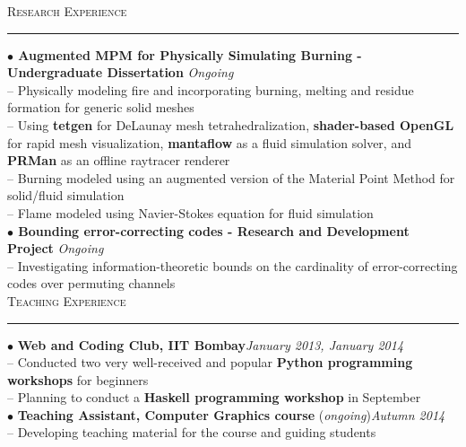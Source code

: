 \documentclass[a4paper,9pt]{article}
\begin{document}
\large{\textsc{Research Experience}}\vspace{1.5pt}
\hrule\vspace{0.25cm}
\small
\textbf{$\bullet$ Augmented MPM for Physically Simulating Burning - Undergraduate Dissertation} \hfill \textit{Ongoing}\\
-- Physically modeling fire and incorporating burning, melting and residue formation for generic solid meshes\\
-- Using \textbf{tetgen} for DeLaunay mesh tetrahedralization, \textbf{shader-based OpenGL} for rapid mesh visualization, \textbf{mantaflow} as a fluid simulation solver, and \textbf{PRMan} as an offline raytracer renderer\\
-- Burning modeled using an augmented version of the Material Point Method for solid/fluid simulation\\
-- Flame modeled using Navier-Stokes equation for fluid simulation\\
\textbf{$\bullet$ Bounding error-correcting codes - Research and Development Project} \hfill \textit{Ongoing}\\
-- Investigating information-theoretic bounds on the cardinality of error-correcting codes over permuting channels\\

\large{\textsc{Teaching Experience}}\vspace{1.5pt}
\hrule\vspace{0.25cm}
\small
$\bullet$ \textbf{Web and Coding Club, IIT Bombay}\hfill \textit{January 2013, January 2014}\\
-- Conducted two very well-received and popular \textbf{Python programming workshops} for beginners\\
-- Planning to conduct a \textbf{Haskell programming workshop} in September\\
$\bullet$ \textbf{Teaching Assistant, Computer Graphics course} (\textit{ongoing})\hfill \textit{Autumn 2014}\\
-- Developing teaching material for the course and guiding students\\
\end{document}
